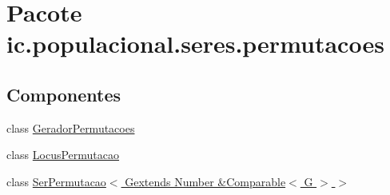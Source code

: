 \hypertarget{namespaceic_1_1populacional_1_1seres_1_1permutacoes}{\section{Pacote ic.\-populacional.\-seres.\-permutacoes}
\label{namespaceic_1_1populacional_1_1seres_1_1permutacoes}
}
\subsection*{Componentes}
\begin{DoxyCompactItemize}
\item 
class \hyperlink{classic_1_1populacional_1_1seres_1_1permutacoes_1_1_gerador_permutacoes}{Gerador\-Permutacoes}
\item 
class \hyperlink{classic_1_1populacional_1_1seres_1_1permutacoes_1_1_locus_permutacao}{Locus\-Permutacao}
\item 
class \hyperlink{classic_1_1populacional_1_1seres_1_1permutacoes_1_1_ser_permutacao_3_01_gextends_01_number_01_6_comparable_3_01_g_01_4_01_4}{Ser\-Permutacao$<$ Gextends Number \&\-Comparable$<$ G $>$ $>$}
\end{DoxyCompactItemize}
